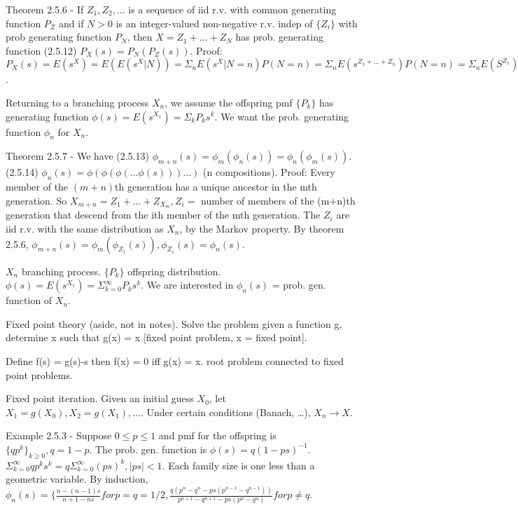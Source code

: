 \documentclass{article}
\begin{document}
Theorem 2.5.6 - If $Z_1, Z_2, \dots$ is a sequence of iid r.v. with common generating function $P_Z$ and if $N > 0$ is an integer-valued non-negative r.v. indep of $\{Z_i\}$ with prob generating function $P_N$, then $X = Z_1 + \dots + Z_N$ has prob. generating function (2.5.12) $P_X(s) = P_N(P_Z(s))$. Proof: $P_X(s) = E(s^X) = E(E(s^X|N)) = \Sigma_n E(s^X|N=n) P(N=n) = \Sigma_n E(s^{Z_1 + \dots + Z_n}) P(N=n) = \Sigma_n E(S^{Z_1}) \cdots E(s^{Z_n}) P(N=n) = \Sigma_n (P_Z(s))^n P(N = n) = P_N(P_Z(s))$.

Returning to a branching process $X_n$, we assume the offspring pmf $\{P_k\}$ has generating function $\phi(s) = E(s^{X_1}) = \Sigma_k P_k s^k$. We want the prob. generating function $\phi_n$ for $X_n$.

Theorem 2.5.7 - We have (2.5.13) $\phi_{m+n}(s) = \phi_m(\phi_n(s)) = \phi_n(\phi_m(s))$. (2.5.14) $\phi_n(s) = \phi(\phi(\phi(\dots \phi(s))) \dots )$ (n compositions). Proof: Every member of the $(m+n)$th generation has a unique ancestor in the mth generation. So $X_{m+n} = Z_1 + \dots + Z_{X_m}, Z_i =$ number of members of the (m+n)th generation that descend from the ith member of the mth generation. The $Z_i$ are iid r.v. with the same distribution as $X_n$, by the Markov property. By theorem 2.5.6, $\phi_{m+n}(s) = \phi_m(\phi_{Z_1}(s)), \phi_{Z_1}(s) = \phi_n(s)$.

$X_n$ branching process. $\{P_k\}$ offspring distribution. $\phi(s) = E(s^{X_1}) = \Sigma_{k=0}^{\infty}P_k s^k$. We are interested in $\phi_n(s)$ = prob. gen. function of $X_n$.

Fixed point theory (aside, not in notes). Solve the problem given a function g, determine x such that g(x) = x [fixed point problem, x = fixed point].

Define f(s) = g(s)-s then f(x) = 0 iff g(x) = x. root problem connected to fixed point problems.

Fixed point iteration. Given an initial guess $X_0$, let $X_1 = g(X_0), X_2 = g(X_1), \dots$. Under certain conditions (Banach, \dots), $X_n \rightarrow X$.

Example 2.5.3 - Suppose $0 \le p \le 1$ and pmf for the offspring is $\{q p^k\}_{k \ge 0}, q = 1-p$. The prob. gen. function is $\phi(s) = q(1-ps)^{-1}$. $\Sigma_{k=0}^{\infty} q p^k s^k = q \Sigma_{k=0}^{\infty} (ps)^k, |ps| < 1$. Each family size is one less than a geometric variable. By induction, $\phi_n(s) = \{ \frac{n-(n-1)s}{n + 1 - ns} for p = q = 1/2, \frac{q(p^n - q^n - ps (p^{n-1}-q^{n-1}))}{p^{n+1}-q^{n+1}-ps(p^n-q^n)} for p \ne q$.
\end{document}
